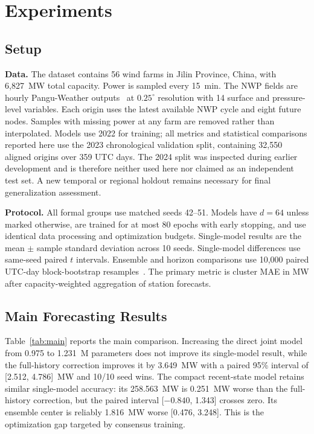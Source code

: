 \documentclass[conference]{IEEEtran}
\begin{document}
\section{Experiments}

\subsection{Setup}

\textbf{Data.}
The dataset contains 56 wind farms in Jilin Province, China, with 6,827~MW total capacity. Power is sampled every 15~min. The NWP fields are hourly Pangu-Weather outputs~\cite{ref_pangu} at $0.25^\circ$ resolution with 14 surface and pressure-level variables. Each origin uses the latest available NWP cycle and eight future nodes. Samples with missing power at any farm are removed rather than interpolated. Models use 2022 for training; all metrics and statistical comparisons reported here use the 2023 chronological validation split, containing 32,550 aligned origins over 359 UTC days. The 2024 split was inspected during earlier development and is therefore neither used here nor claimed as an independent test set. A new temporal or regional holdout remains necessary for final generalization assessment.

\textbf{Protocol.}
All formal groups use matched seeds 42--51. Models have $d=64$ unless marked otherwise, are trained for at most 80 epochs with early stopping, and use identical data processing and optimization budgets. Single-model results are the mean $\pm$ sample standard deviation across 10 seeds. Single-model differences use same-seed paired $t$ intervals. Ensemble and horizon comparisons use 10,000 paired UTC-day block-bootstrap resamples~\cite{ref_bootstrap}. The primary metric is cluster MAE in MW after capacity-weighted aggregation of station forecasts.

\subsection{Main Forecasting Results}

Table~\ref{tab:main} reports the main comparison. Increasing the direct joint model from 0.975 to 1.231~M parameters does not improve its single-model result, while the full-history correction improves it by 3.649~MW with a paired 95\% interval of [2.512, 4.786]~MW and 10/10 seed wins. The compact recent-state model retains similar single-model accuracy: its 258.563~MW is 0.251~MW worse than the full-history correction, but the paired interval [$-0.840$, 1.343] crosses zero. Its ensemble center is reliably 1.816~MW worse [0.476, 3.248]. This is the optimization gap targeted by consensus training.
\end{document}
